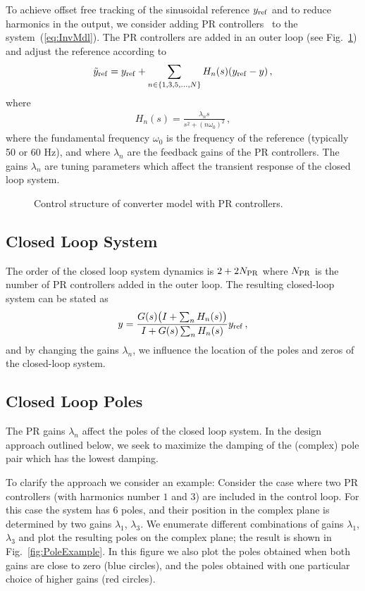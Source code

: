 \documentclass[conference,10pt]{IEEEtran}
\begin{document}
To achieve offset free tracking of the sinusoidal reference $y_{\rm ref}$ and to reduce harmonics in the output, we consider adding PR controllers~\cite{fukuda2001novel} to the system~(\ref{eq:InvMdl}).
The PR controllers are added in an outer loop (see Fig.~\ref{fig:ControlStructure}) and adjust the reference according to
\begin{align*}
\tilde{y}_{\rm ref} = y_{\rm ref} + \sum_{n\in\{1,3,5,\dots, N\}}H_n(s)(y_{\rm ref}-y)\,,
\end{align*}
where
\begin{align*}
H_n(s) = \frac{\lambda_ns}{s^2 + (n\omega_0)^2}\,,
\end{align*}
where the fundamental frequency $\omega_0$ is the frequency of the reference (typically 50 or 60 Hz), and where $\lambda_n$ are the feedback gains of the PR controllers. The gains $\lambda_n$ are tuning parameters which affect the transient response of the closed loop system.
\begin{figure}[!h]
\centering

\caption{Control structure of converter model with PR controllers.}
\label{fig:ControlStructure}
\end{figure}


\subsection{Closed Loop System}

The order of the closed loop system dynamics is $2+2N_{\rm PR}$ where $N_{\rm PR}$ is the number of PR controllers added in the outer loop. The resulting closed-loop system can be stated as
\begin{align}\label{eq:ClosedLoopTF}
  y = \frac{G(s)\big{(} I + \sum_n H_n(s)\big{)}}{I + G(s) \sum_n H_n(s)} y_{\rm ref}\,,
\end{align}
and by changing the gains $\lambda_n$, we influence the location of the poles and zeros of the closed-loop system.


\subsection{Closed Loop Poles}
The PR gains $\lambda_n$ affect the poles of the closed loop system. In the design approach outlined below, we seek to maximize the damping of the (complex) pole pair which has the lowest damping.

To clarify the approach we consider an example: Consider the case where two PR controllers (with harmonics number $1$ and $3$) are included in the control loop. For this case the system has $6$ poles, and their position in the complex plane is determined by  two gains $\lambda_1$, $\lambda_3$.
We enumerate different combinations of gains $\lambda_1$, $\lambda_3$ and plot the resulting poles on the complex plane; the result is shown in Fig.~\ref{fig:PoleExample}. In this figure we also plot the poles obtained when both gains are close to zero (blue circles), and the poles obtained with one particular choice of higher gains (red circles).
\end{document}
